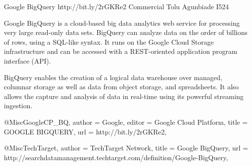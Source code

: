 Google BigQuery 
http://bit.ly/2rGKRe2 
Commercial 
Tolu Agunbiade 
I524

Google BigQuery is a cloud-based big data analytics web service for processing
very large read-only data sets. BigQuery can analyze data on the order of
billions of rows, using a SQL-like syntax. It runs on the Google Cloud Storage
infrastructure and can be accessed with a REST-oriented application program
interface (API)\cite{TechTarget}.

BigQuery enables the creation of a logical data warehouse over managed, columnar
storage as well as data from object storage, and spreadsheets. It also allows
the capture and analysis of data in real-time using its powerful streaming
ingestion\cite{GoogleCP_BQ}.

@Misc{GoogleCP_BQ, 
author = {Google}, 
editor = {Google Cloud Platform}, 
title = {GOOGLE BIGQUERY}, 
url = {http://bit.ly/2rGKRe2},
}


@Misc{TechTarget,
author = {TechTarget Network}, 
title = {Google BigQuery}, 
url = {http://searchdatamanagement.techtarget.com/definition/Google-BigQuery},
}
